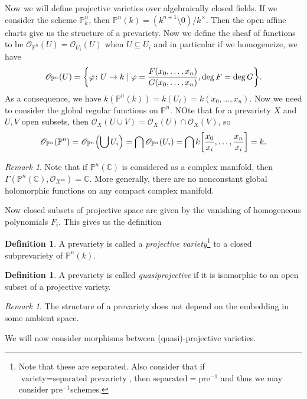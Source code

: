 \documentclass[leqno, openany]{memoir}
\theoremstyle{definition}
\newtheorem{defn}[thm]{Definition}
\theoremstyle{remark}
\newtheorem{rmk}[thm]{Remark}
\theoremstyle{plain}
\theoremstyle{definition}
\theoremstyle{remark}
\newcommand{\C}{\mathbb{C}}
\renewcommand{\P}{\mathbb{P}}
\newcommand{\mr}[1]{\mathrm{#1}}
\newcommand{\msc}[1]{\mathscr{#1}}
\begin{document}
Now we will define projective varieties over algebraically closed fields. If we consider the scheme $\P^n_k$, then $\P^n(k) = (k^{n+1} \setminus \qty{0}) / k^{\times}$. Then the open affine charts give us the structure of a prevariety. Now we define the sheaf of functions to be $\msc{O}_{\P^n}(U) = \msc{O}_{U_i}(U)$ when $U \subseteq U_i$ and in particular if we homogeneize, we have
\[ \msc{O}_{\P^n}(U) = \qty{\varphi \colon U \to k \mid \varphi = \frac{F(x_0, \ldots, x_n)}{G(x_0, \ldots, x_n)}, \deg F = \deg G}. \]
As a consequence, we have $k(\P^n(k)) = k(U_i) = k(x_0, \ldots, x_n)$. Now we need to consider the global regular functions on $\P^n$. NOte that for a prevariety $X$ and $U,V$ open subsets, then $\msc{O}_X(U \cup V) = \msc{O}_X(U) \cap \msc{O}_X(V)$, so
\[ \msc{O}_{\P^n}(\P^n) = \msc{O}_{\P^n} \qty(\bigcup U_i) = \bigcap \msc{O}_{\P^n}(U_i) = \bigcap k\qty[ \frac{x_0}{x_i}, \ldots, \frac{x_n}{x_i} ] = k. \]

\begin{rmk}
    Note that if $\P^n(\C)$ is considered as a complex manifold, then $\Gamma(\P^n(\C), \msc{O}_{X^{\mr{an}}}) = \C$. More generally, there are no nonconstant global holomorphic functions on any compact complex manifold.
\end{rmk}

Now closed subsets of projective space are given by the vanishing of homogeneous polynomials $F_i$. This gives us the definition
\begin{defn}
    A prevariety is called a \textit{projective variety}\footnote{Note that these are separated. Also consider that if $\text{variety} = \text{separated prevariety}$, then $\text{separated} = \text{pre}^{-1}$ and thus we may consider $\text{pre}^{-1}$schemes.} to a closed subprevariety of $\P^n(k)$.
\end{defn}

\begin{defn}
    A prevariety is called \textit{quasiprojective} if it is isomorphic to an open subset of a projective variety.
\end{defn}

\begin{rmk}
    The structure of a prevariety does not depend on the embedding in some ambient space.
\end{rmk}

We will now consider morphisms between (quasi)-projective varieties.
\end{document}
